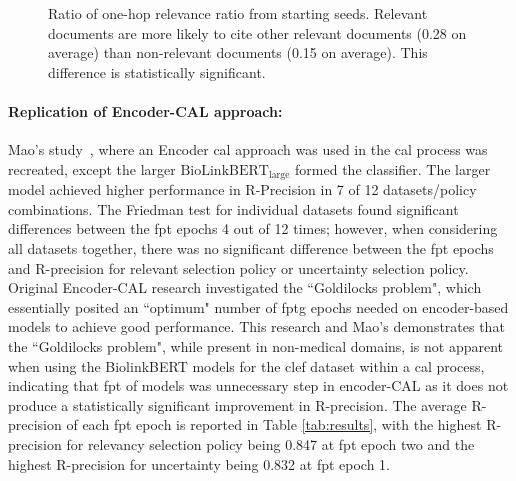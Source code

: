 \documentclass[10pt,oneside]{book}
\begin{document}
\begin{figure}
    \centering
    
    \caption{Ratio of one-hop relevance ratio from starting seeds. Relevant documents are more likely to cite other relevant documents (0.28 on average) than non-relevant documents (0.15 on average). This difference is statistically significant.}
    \label{fig:bcs_experiement}
\end{figure}

\paragraph{Replication of Encoder-CAL approach:}
Mao's study~\cite{mao_reproducibility_2024}, where an Encoder \gls*{cal} approach was used in the \gls*{cal} process was recreated, except the larger $\text{BioLinkBERT}_{\text{large}}$ formed the classifier. The larger model achieved higher performance in R-Precision in 7 of 12 datasets/policy combinations. The Friedman test for individual datasets found significant differences between the \gls*{fpt} epochs 4 out of 12 times; however, when considering all datasets together, there was no significant difference between the \gls*{fpt} epochs and R-precision for relevant selection policy or uncertainty selection policy. Original Encoder-CAL research investigated the ``Goldilocks problem", which essentially posited an ``optimum" number of \gls*{fpt}g epochs needed on encoder-based models to achieve good performance. This research and Mao's demonstrates that the ``Goldilocks problem", while present in non-medical domains, is not apparent when using the BiolinkBERT models for the \gls*{clef} dataset within a \gls*{cal} process, indicating that \gls*{fpt} of models was unnecessary step in encoder-CAL as it does not produce a statistically significant improvement in R-precision. The average R-precision of each \gls*{fpt} epoch is reported in Table \ref{tab:results}, with the highest R-precision for relevancy selection policy being 0.847 at \gls*{fpt} epoch two and the highest R-precision for uncertainty being 0.832 at \gls*{fpt} epoch 1.  
\end{document}
